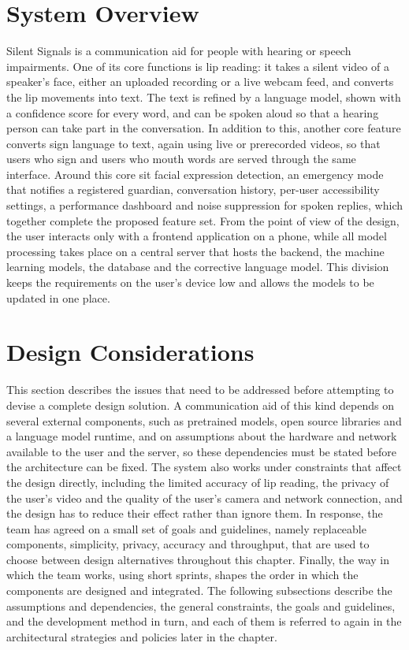 \documentclass{FastFyp}
\begin{document}
\section{System Overview}
Silent Signals is a communication aid for people with hearing or speech impairments. One of its core functions is lip reading: it takes a silent video of a speaker's face, either an uploaded recording or a live webcam feed, and converts the lip movements into text. The text is refined by a language model, shown with a confidence score for every word, and can be spoken aloud so that a hearing person can take part in the conversation. In addition to this, another core feature converts sign language to text, again using live or prerecorded videos, so that users who sign and users who mouth words are served through the same interface. Around this core sit facial expression detection, an emergency mode that notifies a registered guardian, conversation history, per-user accessibility settings, a performance dashboard and noise suppression for spoken replies, which together complete the proposed feature set. From the point of view of the design, the user interacts only with a frontend application on a phone, while all model processing takes place on a central server that hosts the backend, the machine learning models, the database and the corrective language model. This division keeps the requirements on the user's device low and allows the models to be updated in one place.

\section{Design Considerations}
This section describes the issues that need to be addressed before attempting to devise a complete design solution. A communication aid of this kind depends on several external components, such as pretrained models, open source libraries and a language model runtime, and on assumptions about the hardware and network available to the user and the server, so these dependencies must be stated before the architecture can be fixed. The system also works under constraints that affect the design directly, including the limited accuracy of lip reading, the privacy of the user's video and the quality of the user's camera and network connection, and the design has to reduce their effect rather than ignore them. In response, the team has agreed on a small set of goals and guidelines, namely replaceable components, simplicity, privacy, accuracy and throughput, that are used to choose between design alternatives throughout this chapter. Finally, the way in which the team works, using short sprints, shapes the order in which the components are designed and integrated. The following subsections describe the assumptions and dependencies, the general constraints, the goals and guidelines, and the development method in turn, and each of them is referred to again in the architectural strategies and policies later in the chapter.
\end{document}
